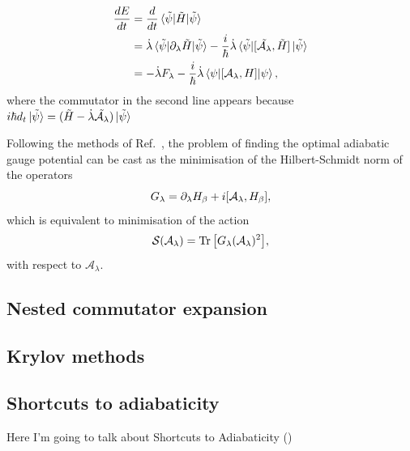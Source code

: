     \begin{equation}\label{eq:energy_derivative}
        \begin{aligned}
            \frac{dE}{dt} &= \frac{d}{dt}\ev*{\Tilde{H}}{\Tilde{\psi}} \\
            &= \dotlambda \ev*{\dlambda \Tilde{H}}{\Tilde{\psi}} - \frac{i}{\hbar} \dotlambda \ev*{\comm*{\Tilde{\AGP{\lambda}}}{\Tilde{H}}}{\Tilde{\psi}} \\
            &= -\dotlambda F_{\lambda} - \frac{i}{\hbar} \dotlambda \ev{\comm{\AGP{\lambda}}{H}}{\psi},
        \end{aligned}
    \end{equation}
    where the commutator in the second line appears because $i\hbar d_t \ket*{\Tilde{\psi}} = (\Tilde{H} - \dot{\lambda}\Tilde{\mathcal{A}_{\lambda}}) \ket*{\Tilde{\psi}}$
    
    Following the methods of Ref.~\cite{sels_minimizing_2017}, the problem of finding the optimal adiabatic gauge potential can be cast as the minimisation of the Hilbert-Schmidt norm of the operators
    \begin{equation}\label{eq:Goperator}
     G_{\lambda}= \dlambda H_\beta + i\comm{\mathcal{A}_\lambda}{H_\beta},
    \end{equation}
    which is equivalent to minimisation of the action
    \begin{equation}\label{eq:actionCD}
    \mathcal{S}(\mathcal{A}_{\lambda}) = \Trace{\left[G_{\lambda}(\mathcal{A}_{\lambda})^2\right]},
    \end{equation}
    with respect to $\mathcal{A}_{\lambda}$.
    \subsection{Nested commutator expansion}
    \subsection{Krylov methods}

    \subsection{Shortcuts to adiabaticity}
    
    Here I'm going to talk about Shortcuts to Adiabaticity 
    ()
